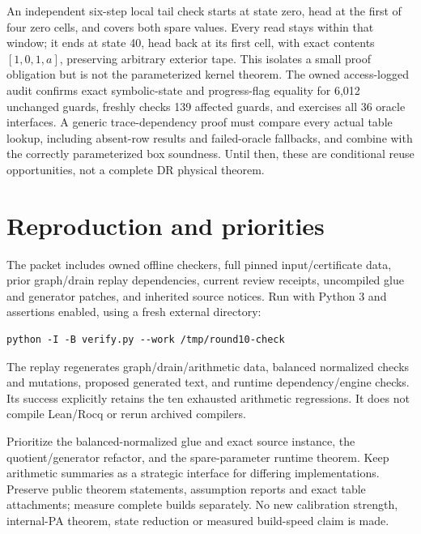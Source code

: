 \documentclass[11pt]{article}
\begin{document}
An independent six-step local tail check starts at state zero, head at the first of four zero cells, and covers both spare values. Every read stays within that window; it ends at state 40, head back at its first cell, with exact contents $[1,0,1,a]$, preserving arbitrary exterior tape. This isolates a small proof obligation but is not the parameterized kernel theorem. The owned access-logged audit confirms exact symbolic-state and progress-flag equality for 6,012 unchanged guards, freshly checks 139 affected guards, and exercises all 36 oracle interfaces. A generic trace-dependency proof must compare every actual table lookup, including absent-row results and failed-oracle fallbacks, and combine with the correctly parameterized box soundness. Until then, these are conditional reuse opportunities, not a complete DR physical theorem.

\section{Reproduction and priorities}
The packet includes owned offline checkers, full pinned input/certificate data, prior graph/drain replay dependencies, current review receipts, uncompiled glue and generator patches, and inherited source notices. Run with Python 3 and assertions enabled, using a fresh external directory:
\begin{verbatim}
python -I -B verify.py --work /tmp/round10-check
\end{verbatim}
The replay regenerates graph/drain/arithmetic data, balanced normalized checks and mutations, proposed generated text, and runtime dependency/engine checks. Its success explicitly retains the ten exhausted arithmetic regressions. It does not compile Lean/Rocq or rerun archived compilers.

Prioritize the balanced-normalized glue and exact source instance, the quotient/generator refactor, and the spare-parameter runtime theorem. Keep arithmetic summaries as a strategic interface for differing implementations. Preserve public theorem statements, assumption reports and exact table attachments; measure complete builds separately. No new calibration strength, internal-PA theorem, state reduction or measured build-speed claim is made.
\end{document}
